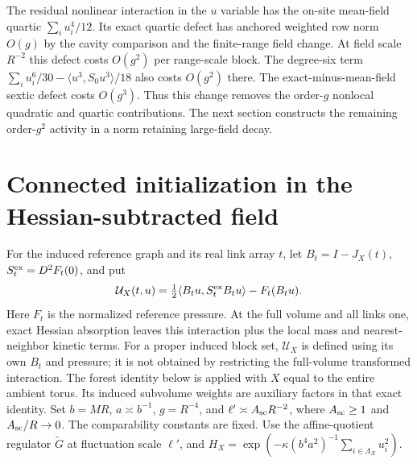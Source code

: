 \documentclass[11pt]{article}
\begin{document}
The residual nonlinear interaction in the \(u\) variable has the
on-site mean-field quartic \(\sum_i u_i^4/12\). Its exact quartic
defect has anchored weighted row norm \(O(g)\) by the cavity comparison
and the finite-range field change. At field scale \(R^{-2}\) this
defect costs \(O(g^2)\) per range-scale block. The degree-six term
\(\sum_i u_i^6/30-\langle u^3,S_0u^3\rangle/18\) also costs \(O(g^2)\)
there. The exact-minus-mean-field sextic defect costs \(O(g^3)\).
Thus this change removes the order-\(g\) nonlocal quadratic and
quartic contributions. The next section constructs the remaining
order-\(g^2\) activity in a norm retaining large-field decay.

\section{Connected initialization in the Hessian-subtracted field}

For the induced reference graph and its real link array \(t\), let
\(B_t=I-J_X(t)\), \(S_t^{\rm ex}=D^2F_t(0)\), and put
\[
 \mathcal U_X(t,u)=\tfrac12\langle B_tu,S_t^{\rm ex}B_tu\rangle
                         -F_t(B_tu).
\]
Here \(F_t\) is the normalized reference pressure. At the full
volume and all links one, exact Hessian absorption leaves this
interaction plus the local mass and nearest-neighbor kinetic terms.
For a proper induced block set, \(\mathcal U_X\) is defined using
its own \(B_t\) and pressure; it is not obtained by restricting the
full-volume transformed interaction. The forest identity below is
applied with \(X\) equal to the entire ambient torus. Its induced
subvolume weights are auxiliary factors in that exact identity.
Set \(b=MR\), \(a\asymp b^{-1}\), \(g=R^{-4}\), and
\(\ell'\asymp A_{\rm sc} R^{-2}\), where \(A_{\rm sc}\ge1\) and \(A_{\rm sc}/R\to0\).
The comparability constants are fixed. Use the affine-quotient
regulator \(\widetilde G\) at fluctuation scale \(\ell'\), and
\(H_X=\exp(-\kappa(b^4a^2)^{-1}\sum_{i\in\Lambda_X}u_i^2)\).
\end{document}

